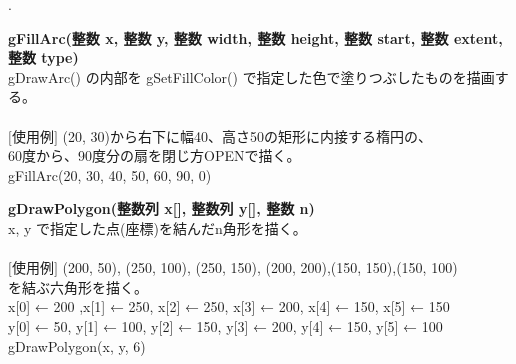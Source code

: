 \documentclass[11pt,a4j]{jarticle}
\newcounter{enum2}
\newenvironment{enumerate2}{%
   \begin{list}%
   {%
      \arabic{enum2}.\ \,%
   }%
   {%
      \usecounter{enum2}
      \setlength{\itemindent}{0zw}%
      \setlength{\leftmargin}{3zw}%
      \setlength{\rightmargin}{0zw}%
      \setlength{\labelsep}{0zw}%
      \setlength{\labelwidth}{3zw}%
      \setlength{\itemsep}{0em}%
      \setlength{\parsep}{0em}%
      \setlength{\listparindent}{0zw}%
   }
}{%
   \end{list}%
}
\begin{document}
\begin{enumerate2}
\item {\bf{gFillArc(整数 x, 整数 y, 整数 width, 整数 height, 整数 start, 整数 extent, 整数 type)}} \\
       gDrawArc() の内部を gSetFillColor() で指定した色で塗りつぶしたものを描画する。 \\
\ \\
	  \hspace{10pt}  $[$使用例$]$ (20, 30)から右下に幅40、高さ50の矩形に内接する楕円の、\\
          \hspace{55pt} 60度から、90度分の扇を閉じ方OPENで描く。 \\
          \hspace{55pt}    gFillArc(20, 30, 40, 50, 60, 90, 0) \\

\item {\bf{gDrawPolygon(整数列 x[], 整数列 y[], 整数 n)}} \\
       x, y で指定した点(座標)を結んだn角形を描く。\\
\ \\
	  \hspace{10pt}  $[$使用例$]$ (200, 50), (250, 100), (250, 150), (200, 200),(150, 150),(150, 100)\\
          \hspace{55pt}  を結ぶ六角形を描く。\\
          \hspace{55pt}    x[0] ← 200 ,x[1] ← 250, x[2] ← 250, x[3] ← 200, x[4] ← 150, x[5] ← 150 \\
          \hspace{55pt}    y[0] ← 50, y[1] ← 100, y[2] ← 150, y[3] ← 200, y[4] ← 150, y[5] ← 100 \\ 
          \hspace{55pt}    gDrawPolygon(x, y, 6) \\


\end{enumerate2}
\end{document}
